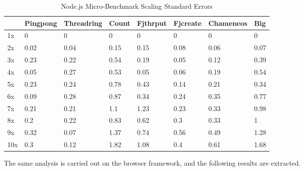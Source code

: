 \documentclass[oneside]{um-fict}
\begin{document}
\begin{table}[H]
    \begin{center}
        \begin{tabular}{|l|lllllll|}
        \hline
        & Pingpong & Threadring & Count & Fjthrput & Fjcreate & Chameneos & Big  \\ \hline
        1x  & 0        & 0          & 0     & 0        & 0        & 0    & 0    \\
        2x  & 0.02     & 0.04       & 0.15  & 0.15     & 0.08     & 0.06 & 0.07 \\
        3x  & 0.23     & 0.22       & 0.54  & 0.19     & 0.05     & 0.12 & 0.39 \\
        4x  & 0.05     & 0.27       & 0.53  & 0.05     & 0.06     & 0.19 & 0.54 \\
        5x  & 0.23     & 0.24       & 0.78  & 0.43     & 0.14     & 0.21 & 0.34 \\
        6x  & 0.09     & 0.28       & 0.87  & 0.34     & 0.24     & 0.35 & 0.77 \\
        7x  & 0.21     & 0.21       & 1.1   & 1.23     & 0.23     & 0.33 & 0.98 \\
        8x  & 0.2      & 0.22       & 0.83  & 0.62     & 0.3      & 0.33 & 1    \\
        9x  & 0.32     & 0.07       & 1.37  & 0.74     & 0.56     & 0.49 & 1.28 \\
        10x & 0.3      & 0.12       & 1.82  & 1.08     & 0.4      & 0.61 & 1.68 \\ \hline
        \end{tabular}
        \caption{Node.js Micro-Benchmark Scaling Standard Errors}\label{tab:nodeloadscalingsem}
    \end{center}
\end{table}

The same analysis is carried out on the browser framework, and the following results are extracted.
\end{document}
